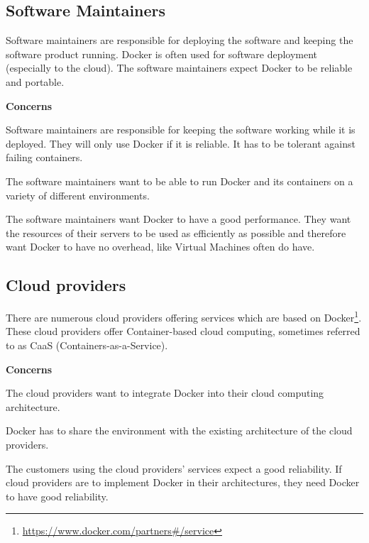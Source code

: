 \subsection*{Software Maintainers}
Software maintainers are responsible for deploying the software and keeping the software product running. Docker is often used for software deployment (especially to the cloud). %
The software maintainers expect Docker to be reliable and portable.

\textbf{Concerns}
\begin{description}[labelindent=25pt,style=multiline,leftmargin=4.0cm,font=\normalfont\itshape]

\item[Reliability] Software maintainers are responsible for keeping the software working while it is deployed. They will only use Docker if it is reliable. It has to be tolerant against failing containers.

\item[Portability] The software maintainers want to be able to run Docker and its containers on a variety of different environments.

\item[Performance efficiency] The software maintainers want Docker to have a good performance. They want the resources of their servers to be used as efficiently as possible and therefore want Docker to have no overhead, like Virtual Machines often do have.

\end{description}



\subsection*{Cloud providers}
There are numerous cloud providers offering services which are based on Docker\footnote{\url{https://www.docker.com/partners\#/service}}. These cloud providers offer Container-based cloud computing, sometimes referred to as CaaS (Containers-as-a-Service).


\textbf{Concerns}
\begin{description}[labelindent=25pt,style=multiline,leftmargin=4.0cm,font=\normalfont\itshape]

\item[Installability] The cloud providers want to integrate Docker into their cloud computing architecture.

\item[Co-Existence] Docker has to share the environment with the existing architecture of the cloud providers.

\item[Reliability] The customers using the cloud providers' services expect a good reliability. If cloud providers are to implement Docker in their architectures, they need Docker to have good reliability.

\end{description}




